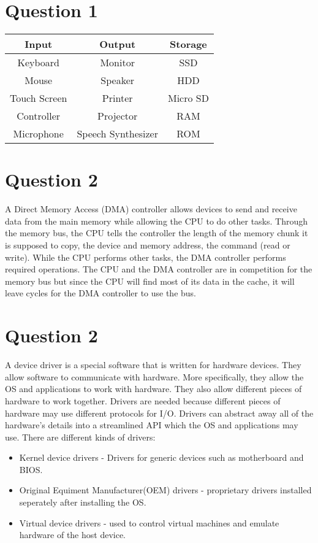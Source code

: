 \documentclass[12pt, a4paper]{article}
\begin{document}
\section{Question 1}

\begin{center}
  \begin{tabular} {|c|c|c|}
    \hline
    \textbf{Input} & \textbf{Output} & \textbf{Storage} \\
    \hline
    Keyboard & Monitor & SSD \\
    Mouse & Speaker & HDD \\
    Touch Screen & Printer & Micro SD \\
    Controller & Projector & RAM \\
    Microphone & Speech Synthesizer & ROM \\
    \hline
  \end{tabular}
\end{center}

\section{Question 2}
A Direct Memory Access (DMA) controller allows devices to send and receive
data from the main memory while allowing the CPU to do other tasks. Through
the memory bus, the CPU tells the controller the length of the memory chunk
it is supposed to copy, the device and memory address, the command (read
or write). While the CPU performs other tasks, the DMA controller performs
required operations. The CPU and the DMA controller are in competition for 
the memory bus but since the CPU will find most of its data in the cache,
it will leave cycles for the DMA controller to use the bus.

\section{Question 2}
A device driver is a special software that is written for hardware devices.
They allow software to communicate with hardware. More specifically, they
allow the OS and applications to work with hardware. They also allow 
different pieces of hardware to work together. Drivers are needed because
different pieces of hardware may use different protocols for I/O. Drivers
can abstract away all of the hardware's details into a streamlined API which
the OS and applications may use. There are different kinds of drivers: 
\begin{itemize}
  \item Kernel device drivers - Drivers for generic devices such as 
    motherboard and BIOS.
  \item Original Equiment Manufacturer(OEM) drivers - proprietary drivers
    installed seperately after installing the OS.
  \item Virtual device drivers - used to control virtual machines and 
    emulate hardware of the host device.
\end{itemize}
\end{document}
